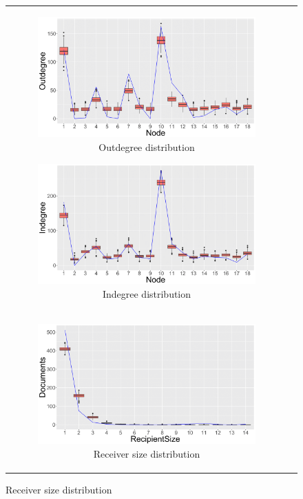\documentclass[ba]{imsart}
\numberwithin{equation}{section}
\theoremstyle{plain}
\begin{document}
	\begin{figure}[!t]
		\centering
		\begin{tabular}[t]{cc}
			\begin{subfigure}[b]{0.495\textwidth}
				\caption{Outdegree distribution}
				\includegraphics[width=\textwidth]{img/outdegree-1.png}	
			\end{subfigure}
			\begin{subfigure}[b]{0.495\textwidth}
				\caption{Indegree distribution}
				\includegraphics[width=\textwidth]{img/indegree-1.png}	
			\end{subfigure}\\
			\begin{subfigure}[b]{0.495\textwidth}
				\caption{Receiver size distribution}
				\includegraphics[width=\textwidth]{img/recipientsize-1.png}	

\end{subfigure}
\end{tabular}
\end{figure}
\end{document}
